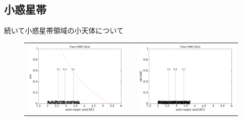 \documentclass[11pt,a4paper,oneside,onecolumn]{jreport}
\begin{document}
\subsection{小惑星帯}
続いて小惑星帯領域の小天体について


\begin{figure}[H]
\begin{tabular}{ccc}
\begin{minipage}[t]{0.45\hsize}
\centering
\includegraphics[width=8cm]{./image/asteroid_ecc_0yr.pdf}
\end{minipage} &
\begin{minipage}[t]{0.1\hsize}
\end{minipage} &
\begin{minipage}[t]{0.45\hsize}
\centering
\includegraphics[width=8cm]{./image/asteroid_inc_0yr.pdf}
\end{minipage}\\
%
\end{tabular}
\caption{\label{fig:asteroid_ecc_inc_0yr}}
\end{figure}
\end{document}
